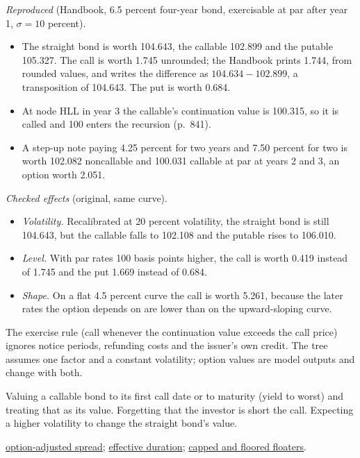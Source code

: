 \begin{qfmethod}
 \emph{Reproduced} (Handbook, 6.5 percent four-year bond, exercisable at par after year 1, $\sigma=10$ percent).
\begin{itemize}
\item The straight bond is worth 104.643, the callable 102.899 and the putable 105.327. The call is worth 1.745 unrounded; the Handbook prints 1.744, from rounded values, and writes the difference as $104.634-102.899$, a transposition of 104.643. The put is worth 0.684.
\item At node HLL in year 3 the callable's continuation value is 100.315, so it is called and 100 enters the recursion (p.~841).
\item A step-up note paying 4.25 percent for two years and 7.50 percent for two is worth 102.082 noncallable and 100.031 callable at par at years 2 and 3, an option worth 2.051.
\end{itemize}

\emph{Checked effects} (original, same curve).
\begin{itemize}
\item \emph{Volatility.} Recalibrated at 20 percent volatility, the straight bond is still 104.643, but the callable falls to 102.108 and the putable rises to 106.010.
\item \emph{Level.} With par rates 100 basis points higher, the call is worth 0.419 instead of 1.745 and the put 1.669 instead of 0.684.
\item \emph{Shape.} On a flat 4.5 percent curve the call is worth 5.261, because the later rates the option depends on are lower than on the upward-sloping curve.
\end{itemize}

 The exercise rule (call whenever the continuation value exceeds the call price) ignores notice periods, refunding costs and the issuer's own credit. The tree assumes one factor and a constant volatility; option values are model outputs and change with both.

 Valuing a callable bond to its first call date or to maturity (yield to worst) and treating that as its value. Forgetting that the investor is short the call. Expecting a higher volatility to change the straight bond's value.

 \hyperref[meth:option-adjusted-spread]{option-adjusted spread}; \hyperref[meth:embedded-option-effective-duration]{effective duration}; \hyperref[meth:capped-floored-floater-valuation]{capped and floored floaters}.

\end{qfmethod}

